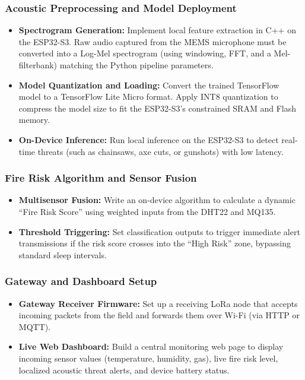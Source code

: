 \subsubsection{Acoustic Preprocessing and Model Deployment}

\begin{itemize}
    \item \textbf{Spectrogram Generation:} Implement local feature
    extraction in C++ on the ESP32-S3. Raw audio captured from the MEMS
    microphone must be converted into a Log-Mel spectrogram (using
    windowing, FFT, and a Mel-filterbank) matching the Python pipeline
    parameters.

    \item \textbf{Model Quantization and Loading:} Convert the trained
    TensorFlow model to a TensorFlow Lite Micro format. Apply INT8
    quantization to compress the model size to fit the ESP32-S3's
    constrained SRAM and Flash memory.

    \item \textbf{On-Device Inference:} Run local inference on the ESP32-S3
    to detect real-time threats (such as chainsaws, axe cuts, or gunshots)
    with low latency.
\end{itemize}

\subsubsection{Fire Risk Algorithm and Sensor Fusion}

\begin{itemize}
    \item \textbf{Multisensor Fusion:} Write an on-device algorithm to
    calculate a dynamic ``Fire Risk Score'' using weighted inputs from the
    DHT22 and MQ135.

    \item \textbf{Threshold Triggering:} Set classification outputs to
    trigger immediate alert transmissions if the risk score crosses into
    the ``High Risk'' zone, bypassing standard sleep intervals.
\end{itemize}

\subsubsection{Gateway and Dashboard Setup}

\begin{itemize}
    \item \textbf{Gateway Receiver Firmware:} Set up a receiving LoRa node
    that accepts incoming packets from the field and forwards them over
    Wi-Fi (via HTTP or MQTT).

    \item \textbf{Live Web Dashboard:} Build a central monitoring web page
    to display incoming sensor values (temperature, humidity, gas), live
    fire risk level, localized acoustic threat alerts, and device battery
    status.
\end{itemize}

